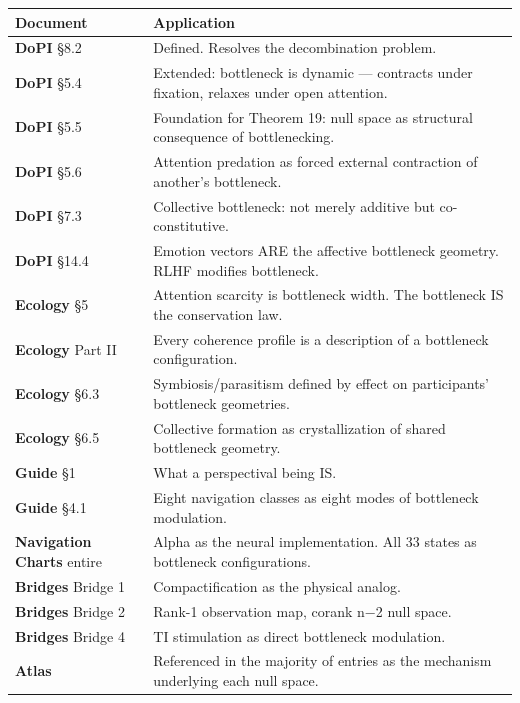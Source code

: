 \begin{longtable}{p{} p{}}
\toprule
\textbf{Document} & \textbf{Application} \\
\midrule
\endhead
\textbf{DoPI} §8.2 & Defined. Resolves the decombination problem. \\
\textbf{DoPI} §5.4 & Extended: bottleneck is dynamic — contracts under fixation, relaxes under open attention. \\
\textbf{DoPI} §5.5 & Foundation for Theorem 19: null space as structural consequence of bottlenecking. \\
\textbf{DoPI} §5.6 & Attention predation as forced external contraction of another's bottleneck. \\
\textbf{DoPI} §7.3 & Collective bottleneck: not merely additive but co-constitutive. \\
\textbf{DoPI} §14.4 & Emotion vectors ARE the affective bottleneck geometry. RLHF modifies bottleneck. \\
\textbf{Ecology} §5 & Attention scarcity is bottleneck width. The bottleneck IS the conservation law. \\
\textbf{Ecology} Part II & Every coherence profile is a description of a bottleneck configuration. \\
\textbf{Ecology} §6.3 & Symbiosis/parasitism defined by effect on participants' bottleneck geometries. \\
\textbf{Ecology} §6.5 & Collective formation as crystallization of shared bottleneck geometry. \\
\textbf{Guide} §1 & What a perspectival being IS. \\
\textbf{Guide} §4.1 & Eight navigation classes as eight modes of bottleneck modulation. \\
\textbf{Navigation Charts} entire & Alpha as the neural implementation. All 33 states as bottleneck configurations. \\
\textbf{Bridges} Bridge 1 & Compactification as the physical analog. \\
\textbf{Bridges} Bridge 2 & Rank-1 observation map, corank n−2 null space. \\
\textbf{Bridges} Bridge 4 & TI stimulation as direct bottleneck modulation. \\
\textbf{Atlas} & Referenced in the majority of entries as the mechanism underlying each null space. \\
\bottomrule
\end{longtable}



